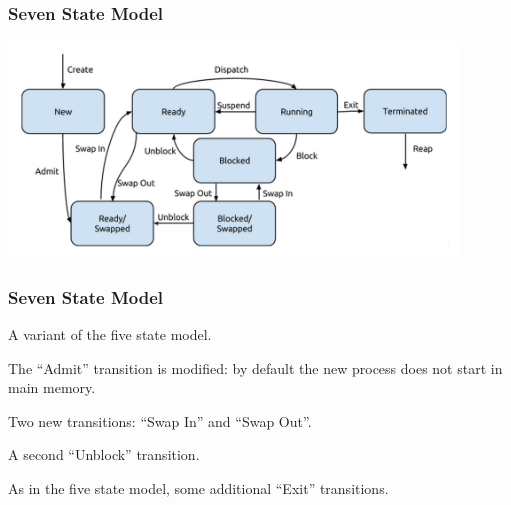\begin{frame}
\frametitle{Seven State Model}

\begin{center}
\includegraphics[width=0.9\textwidth]{images/7-state-model.png}
\end{center}

\end{frame}

\begin{frame}
\frametitle{Seven State Model}
A variant of the five state model.

The ``Admit'' transition is modified: by default the new process does not start in main memory.

Two new transitions: ``Swap In'' and ``Swap Out''.

A second ``Unblock'' transition.

As in the five state model, some additional ``Exit'' transitions.

\end{frame}



